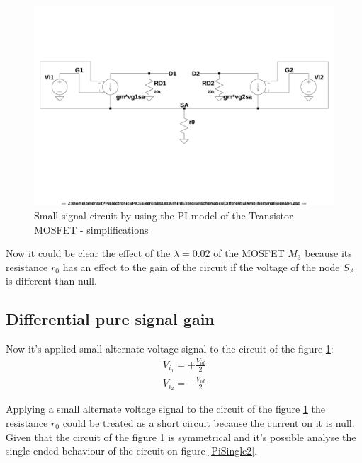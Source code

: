 \begin{figure}[h]
  \centering
  \includegraphics[width=12cm]{schematics/DifferentialAmplifier/SmallSignalPi.jpg}
  \caption{Small signal circuit by using the PI model of the Transistor MOSFET - simplifications}
  \label{PiSimple}
\end{figure}

Now it could be clear the effect of the $\lambda = 0.02$ of the MOSFET $M_3$ because its resistance $r_0$ has an effect to the gain of the circuit if the voltage of the node $S_A$ is different than null.\par

\subsection{Differential pure signal gain}
Now it's applied  small alternate voltage signal to the circuit of the figure \ref{PiSimple}:\\
\begin{align}
V_{i_1} =+ \frac{V_{id}}{2} \label{Vi1d}\\
V_{i_2} =- \frac{V_{id}}{2} \label{Vi2d}
\end{align}


Applying a small alternate voltage signal to the circuit of the figure \ref{PiSimple} the resistance $r_0$ could be treated as a short circuit because the current on it is null.\\
Given that the circuit of the figure \ref{PiSimple} is symmetrical and it's possible analyse the single ended behaviour of the circuit on figure \ref{PiSingle2}.\par

